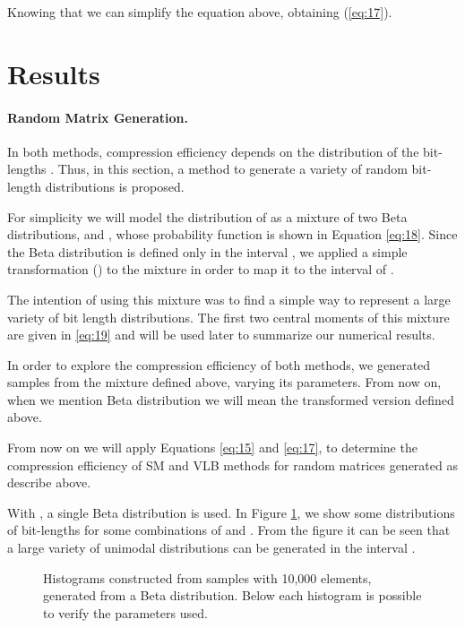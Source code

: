 \documentclass[10pt]{article}
\begin{document}
  
 Knowing that  we can simplify the equation above, obtaining (\ref{eq:17}).
 


\section*{Results}

\paragraph{Random Matrix Generation.}
In both methods, compression efficiency depends on the distribution of the bit-lengths . Thus, in this section, a method to generate a variety of random bit-length distributions is proposed.

For simplicity we will model the distribution of  as a mixture  of two Beta distributions,  and , whose probability function is shown in Equation \ref{eq:18}. Since the Beta distribution is defined only in the interval  , we applied a simple transformation () to the mixture in order to map it to the interval of .



The intention of using this mixture was to find a simple way to represent a large variety of bit length distributions. The first two central moments of this mixture are given in \ref{eq:19} and will be used later to summarize our numerical results.



In order to explore the compression efficiency of both methods, we generated samples from the mixture defined above, varying its parameters. From now on, when we mention Beta distribution we will mean the transformed version defined above.

From now on we will apply Equations \ref{eq:15} and \ref{eq:17}, to determine the compression efficiency of SM and VLB methods for random matrices generated as describe above. 

With , a single Beta distribution is used. In Figure \ref{fig:01020304}, we show some distributions of bit-lengths for some combinations of  and . From the figure it can be seen that a large variety of unimodal distributions can be generated in the interval .
 

\begin{figure}[ht]
  \centering
  \caption{Histograms constructed from samples with 10,000 elements, generated from a Beta distribution. Below each histogram is possible to verify the parameters used.}
  \label{fig:01020304}
\end{figure}
\end{document}
